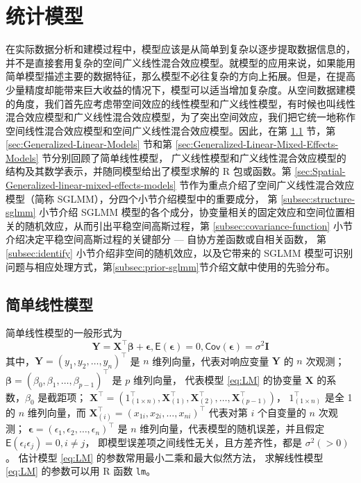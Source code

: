 \documentclass[12pt,a4paper,UTF8,twoside]{book}
\theoremstyle{definition}
\theoremstyle{definition}
\theoremstyle{definition}
\theoremstyle{remark}
\begin{document}
\hypertarget{models}{%
\chapter{统计模型}\label{models}}

在实际数据分析和建模过程中，模型应该是从简单到复杂以逐步提取数据信息的，并不是直接套用复杂的空间广义线性混合效应模型。就模型的应用来说，如果能用简单模型描述主要的数据特征，那么模型不必往复杂的方向上拓展。但是，在提高少量精度却能带来巨大收益的情况下，模型可以适当增加复杂度。从空间数据建模的角度，我们首先应考虑带空间效应的线性模型和广义线性模型，有时候也叫线性混合效应模型和广义线性混合效应模型，为了突出空间效应，我们把它统一地称作空间线性混合效应模型和空间广义线性混合效应模型。因此，在第 \ref{sec:Linear-Models} 节，第 \ref{sec:Generalized-Linear-Models} 节和第 \ref{sec:Generalized-Linear-Mixed-Effects-Models} 节分别回顾了简单线性模型， 广义线性模型和广义线性混合效应模型的结构及其数学表示，并随同模型给出了模型求解的 R 包或函数。第 \ref{sec:Spatial-Generalized-linear-mixed-effects-models} 节作为重点介绍了空间广义线性混合效应模型（简称 SGLMM），分四个小节介绍模型中的重要成分， 第 \ref{subsec:structure-sglmm} 小节介绍 SGLMM 模型的各个成分，协变量相关的固定效应和空间位置相关的随机效应，从而引出平稳空间高斯过程，第 \ref{subsec:covariance-function} 小节介绍决定平稳空间高斯过程的关键部分 --- 自协方差函数或自相关函数， 第 \ref{subsec:identify} 小节介绍非空间的随机效应，以及它带来的 SGLMM 模型可识别问题与相应处理方式，第\ref{subsec:prior-sglmm}节介绍文献中使用的先验分布。

\hypertarget{sec:Linear-Models}{%
\section{简单线性模型}\label{sec:Linear-Models}}

简单线性模型的一般形式为
\begin{equation}
\mathbf{Y} = \mathbf{X}^{\top}\boldsymbol{\beta} + \boldsymbol{\epsilon}, \mathsf{E}(\boldsymbol{\epsilon}) = 0, \mathsf{Cov}(\boldsymbol{\epsilon}) = \sigma^2\mathbf{I}  \label{eq:LM}
\end{equation}
\noindent 其中，\(\mathbf{Y} = (y_1,y_2,\ldots,y_n)^{\top}\) 是 \(n\) 维列向量，代表对响应变量 \(\mathbf{Y}\) 的 \(n\) 次观测； \(\boldsymbol{\beta} = (\beta_0,\beta_1,\ldots,\beta_{p-1})^{\top}\) 是 \(p\) 维列向量， 代表模型 \eqref{eq:LM} 的协变量 \(\mathbf{X}\) 的系数，\(\beta_0\) 是截距项； \(\mathbf{X}^{\top} = (1_{(1\times n)}^{\top},\mathbf{X}_{(1)}^{\top},\mathbf{X}_{(2)}^{\top},\ldots,\mathbf{X}_{(p-1)}^{\top})\)， \(1_{(1\times n)}^{\top}\) 是全 1 的 \(n\) 维列向量，而 \(\mathbf{X}_{(i)}^{\top} = (x_{1i},x_{2i},\ldots,x_{ni})^{\top}\) 代表对第 \(i\) 个自变量的 \(n\) 次观测； \(\boldsymbol{\epsilon} = (\epsilon_1,\epsilon_2,\ldots,\epsilon_n)^{\top}\) 是 \(n\) 维列向量，代表模型的随机误差，并且假定 \(\mathsf{E}(\epsilon_i \epsilon_j) = 0, i \ne j\)， 即模型误差项之间线性无关，且方差齐性，都是 \(\sigma^2(>0)\)。 估计模型 \eqref{eq:LM} 的参数常用最小二乘和最大似然方法， 求解线性模型 \eqref{eq:LM} 的参数可以用 R 函数 \texttt{lm}。
\end{document}
